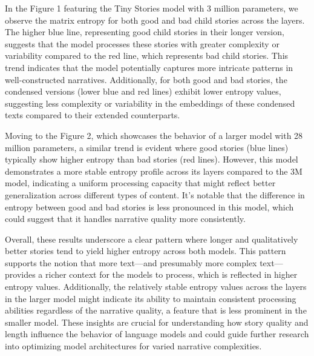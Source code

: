 \documentclass{article}
\begin{document}
In the Figure 1 featuring the Tiny Stories model with 3 million parameters, we observe the matrix entropy for both good and bad child stories across the layers. The higher blue line, representing good child stories in their longer version, suggests that the model processes these stories with greater complexity or variability compared to the red line, which represents bad child stories. This trend indicates that the model potentially captures more intricate patterns in well-constructed narratives. Additionally, for both good and bad stories, the condensed versions (lower blue and red lines) exhibit lower entropy values, suggesting less complexity or variability in the embeddings of these condensed texts compared to their extended counterparts.

Moving to the Figure 2, which showcases the behavior of a larger model with 28 million parameters, a similar trend is evident where good stories (blue lines) typically show higher entropy than bad stories (red lines). However, this model demonstrates a more stable entropy profile across its layers compared to the 3M model, indicating a uniform processing capacity that might reflect better generalization across different types of content. It's notable that the difference in entropy between good and bad stories is less pronounced in this model, which could suggest that it handles narrative quality more consistently.

Overall, these results underscore a clear pattern where longer and qualitatively better stories tend to yield higher entropy across both models. This pattern supports the notion that more text—and presumably more complex text—provides a richer context for the models to process, which is reflected in higher entropy values. Additionally, the relatively stable entropy values across the layers in the larger model might indicate its ability to maintain consistent processing abilities regardless of the narrative quality, a feature that is less prominent in the smaller model. These insights are crucial for understanding how story quality and length influence the behavior of language models and could guide further research into optimizing model architectures for varied narrative complexities.
\end{document}
